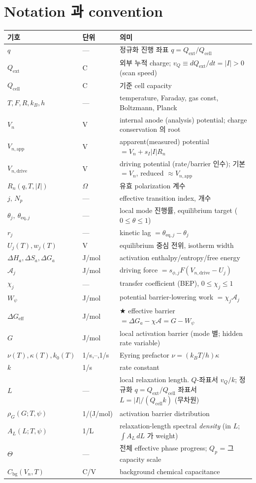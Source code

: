 \documentclass[11pt,a4paper]{article}
\newcommand{\eff}{\mathrm{eff}}
\newcommand{\eq}{\mathrm{eq}}
\newcommand{\app}{\mathrm{app}}
\newcommand{\dimedrive}{\mathrm{drive}}
\newcommand{\bg}{\mathrm{bg}}
\newcommand{\cell}{\mathrm{cell}}
\newcommand{\ext}{\mathrm{ext}}
\begin{document}
\section{Notation 과 convention}\label{sec:notation}
\begin{longtable}{p{} p{} p{}}
\toprule 기호 & 단위 & 의미 \\ \midrule \endhead
$q$ & --- & 정규화 진행 좌표 $q=Q_\ext/Q_\cell$ \\
$Q_\ext$ & C & 외부 누적 charge; $v_Q\equiv dQ_\ext/dt=|I|>0$ (scan speed) \\
$Q_\cell$ & C & 기준 cell capacity \\
$T,F,R,k_B,h$ & --- & temperature, Faraday, gas const, Boltzmann, Planck \\
$V_n$ & V & internal anode (analysis) potential; charge conservation 의 root \\
$V_{n,\app}$ & V & apparent(measured) potential $=V_n+s_I|I|R_n$ \\
$V_{n,\dimedrive}$ & V & driving potential (rate/barrier 인수); 기본 $=V_n$, reduced $\approx V_{n,\app}$ \\
$R_n(q,T,|I|)$ & $\Omega$ & 유효 polarization 계수 \\
$j,\,N_p$ & --- & effective transition index, 개수 \\
$\theta_j,\ \theta_{\eq,j}$ & --- & local mode 진행률, equilibrium target ($0\!\le\!\theta\!\le\!1$) \\
$r_j$ & --- & kinetic lag $=\theta_{\eq,j}-\theta_j$ \\
$U_j(T),w_j(T)$ & V & equilibrium 중심 전위, isotherm width \\
$\Delta H_{a},\Delta S_{a},\Delta G_a$ & J/mol & activation enthalpy/entropy/free energy \\
$\mathcal A_j$ & J/mol & driving force $=s_{\phi,j}F(V_{n,\dimedrive}-U_j)$ \\
$\chi_j$ & --- & transfer coefficient (BEP), $0\le\chi_j\le1$ \\
$W_\psi$ & J/mol & potential barrier-lowering work $=\chi_j\mathcal A_j$ \\
$\Delta G_{\eff}$ & J/mol & ★ effective barrier $=\Delta G_a-\chi\mathcal A=G-W_\psi$ \\
$G$ & J/mol & local activation barrier (mode 별; hidden rate variable) \\
$\nu(T),\kappa(T),k_0(T)$ & 1/s,--,1/s & Eyring prefactor $\nu=(k_BT/h)\kappa$ \\
$k$ & 1/s & rate constant \\
$L$ & --- & local relaxation length. $Q$-좌표서 $v_Q/k$; 정규화 $q=Q_\ext/Q_\cell$ 좌표서 $L=|I|/(Q_\cell k)$ (무차원) \\
$\rho_G(G;T,\psi)$ & 1/(J/mol) & activation barrier distribution \\
$A_L(L;T,\psi)$ & 1/L & relaxation-length spectral \emph{density} (in $L$; $\int A_L\,dL$ 가 weight) \\
$\Theta$ & --- & 전체 effective phase progress; $Q_p$ = 그 capacity scale \\
$C_\bg(V_n,T)$ & C/V & background chemical capacitance \\
\bottomrule
\end{longtable}
\end{document}
